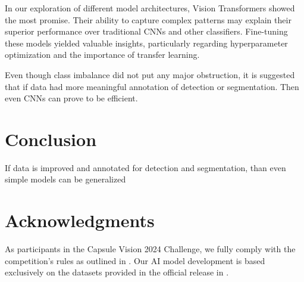 \documentclass[12pt]{article}
\begin{document}
In our exploration of different model architectures, Vision Transformers showed the most promise. Their ability to capture complex patterns may explain their superior performance over traditional CNNs and other classifiers. Fine-tuning these models yielded valuable insights, particularly regarding hyperparameter optimization and the importance of transfer learning.

Even though class imbalance did not put any major obstruction, it is suggested that
if data had more meaningful annotation of detection or segmentation. Then even CNNs
can prove to be efficient.

\section{Conclusion}\label{sec5}
If data is improved and annotated for detection and segmentation, than even simple models can be generalized

\section{Acknowledgments}\label{sec6}
As participants in the Capsule Vision 2024 Challenge, we fully comply with the competition's rules as outlined in \cite{handa2024capsule}. Our AI model development is based exclusively on the datasets provided in the official release in \cite{Handa2024}.



\end{document}
